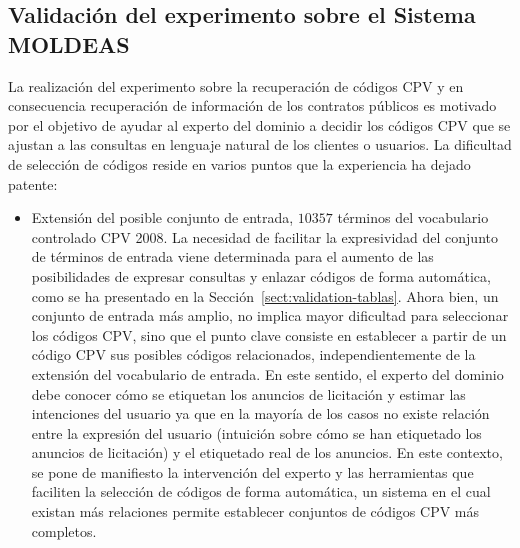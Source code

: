 \subsection{Validación del experimento sobre el Sistema MOLDEAS}
La realización del experimento sobre la recuperación de códigos \gls{CPV} y en consecuencia recuperación 
de información de los contratos públicos es motivado por el objetivo de ayudar al experto del dominio 
a decidir los códigos CPV que se ajustan a las consultas en lenguaje natural de los clientes o 
usuarios. La dificultad de selección de códigos reside en varios puntos que la experiencia ha 
dejado patente:
\begin{itemize}
 \item Extensión del posible conjunto de entrada, $10357$ términos del vocabulario controlado CPV 2008. La necesidad de 
facilitar la expresividad del conjunto de términos de entrada viene determinada para el aumento de las posibilidades 
de expresar consultas y enlazar códigos de forma automática, como se ha presentado en la Sección~\ref{sect:validation-tablas}. Ahora 
bien, un conjunto de entrada más amplio, no implica mayor dificultad para seleccionar los códigos CPV, sino que el punto 
clave consiste en establecer a partir de un código CPV sus posibles códigos relacionados, independientemente 
de la extensión del vocabulario de entrada. En este sentido, el experto del dominio debe conocer cómo se etiquetan 
los anuncios de licitación y estimar las intenciones del usuario ya que en la mayoría de los casos no existe relación 
entre la expresión del usuario (intuición sobre cómo se han etiquetado los anuncios de licitación) y el etiquetado 
real de los anuncios. En este contexto, se pone de manifiesto la intervención del experto y las herramientas 
que faciliten la selección de códigos de forma automática, un sistema en el cual existan más relaciones permite 
establecer conjuntos de códigos CPV más completos.


\end{itemize}
